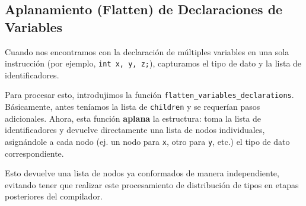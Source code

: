 \documentclass[11pt,a4paper]{article}
\begin{document}
\subsection{Aplanamiento (Flatten) de Declaraciones de Variables}
Cuando nos encontramos con la declaración de múltiples variables en una sola instrucción (por ejemplo, \texttt{int x, y, z;}), capturamos el tipo de dato y la lista de identificadores.

Para procesar esto, introdujimos la función \texttt{flatten\_variables\_declarations}.
Básicamente, antes teníamos la lista de \texttt{children} y se requerían pasos adicionales. Ahora, esta función \textbf{aplana} la estructura: toma la lista de identificadores y devuelve directamente una lista de nodos individuales, asignándole a cada nodo (ej. un nodo para \texttt{x}, otro para \texttt{y}, etc.) el tipo de dato correspondiente. 

Esto devuelve una lista de nodos ya conformados de manera independiente, evitando tener que realizar este procesamiento de distribución de tipos en etapas posteriores del compilador.
\end{document}
